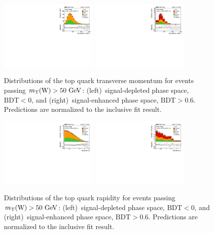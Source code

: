 \documentclass[12pt]{article}
\begin{document}
\begin{figure}[!htbp]
\begin{center}
\includegraphics[width=0.43\textwidth]{reco_toppt_bdtinv.pdf}\hspace{0.05\textwidth}
\includegraphics[width=0.43\textwidth]{reco_toppt_bdt.pdf}
\end{center}

\caption{\label{fig:recotop-pt}Distributions of the top quark transverse momentum for events passing $m_{\mathrm{T}}(\mathrm{W})>50~\mathrm{GeV}$: (left)~signal-depleted phase space, $\mathrm{BDT}<0$, and (right)~signal-enhanced phase space, $\mathrm{BDT}>0.6$. Predictions are normalized to the inclusive fit result.}
\end{figure}

\begin{figure}[!htbp]
\begin{center}
\includegraphics[width=0.43\textwidth]{reco_topy_bdtinv.pdf}\hspace{0.05\textwidth}
\includegraphics[width=0.43\textwidth]{reco_topy_bdt.pdf}
\end{center}

\caption{\label{fig:recotop-y}Distributions of the top quark rapidity for events passing $m_{\mathrm{T}}(\mathrm{W})>50~\mathrm{GeV}$: (left)~signal-depleted phase space, $\mathrm{BDT}<0$, and (right)~signal-enhanced phase space, $\mathrm{BDT}>0.6$. Predictions are normalized to the inclusive fit result.}
\end{figure}
\end{document}
